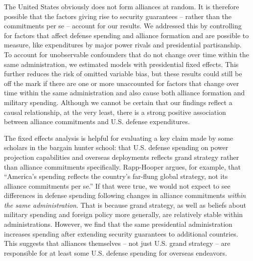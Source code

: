 The United States obviously does not form alliances at random. It is therefore possible that the factors giving rise to security guarantees -- rather than the commitments per se -- account for our results. We addressed this by controlling for factors that affect defense spending and alliance formation and are possible to measure, like expenditures by major power rivals and presidential partisanship. To account for unobservable confounders that do not change over time within the same administration, we estimated models with presidential fixed effects. This further reduces the risk of omitted variable bias, but these results could still be off the mark if there are one or more unaccounted for factors that change over time within the same administration and also cause both alliance formation and military spending. Although we cannot be certain that our findings reflect a causal relationship, at the very least, there is a strong positive association between alliance commitments and U.S. defense expenditures.

The fixed effects analysis is helpful for evaluating a key claim made by some scholars in the bargain hunter school: that U.S. defense spending on power projection capabilities and overseas deployments reflects grand strategy rather than alliance commitments specifically. Rapp-Hooper argues, for example, that ``America's spending reflects the country's far-flung global strategy, not its alliance commitments per se.''\autocite[100]{rapphoopershields20} If that were true, we would not expect to see differences in defense spending following changes in alliance commitments \textit{within the same administration}. That is because grand strategy, as well as beliefs about military spending and foreign policy more generally, are relatively stable within administrations. However, we find that the same presidential administration increases spending after extending security guarantees to additional countries. This suggests that alliances themselves -- not just U.S. grand strategy -- are responsible for at least some U.S. defense spending for overseas endeavors.  

